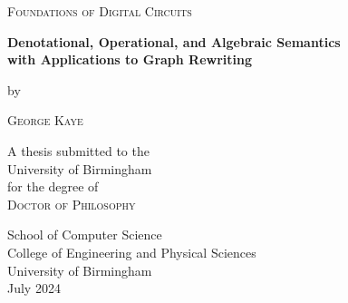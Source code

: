 \begin{titlepage}
  \begin{center}

    \large %

    {\Huge\textsc{Foundations of Digital Circuits}\par}


    {\Large\textbf{
        Denotational, Operational, and Algebraic Semantics\\
        with Applications to Graph Rewriting
      }}


    by


    {\huge\textsc{George Kaye}}


    A thesis submitted to the \\
    University of Birmingham \\
    for the degree of \\
    \textsc{Doctor of Philosophy}

    \vfill

    \flushright
    School of Computer Science \\
    College of Engineering and Physical Sciences \\
    University of Birmingham \\
    July 2024

  \end{center}
\end{titlepage}